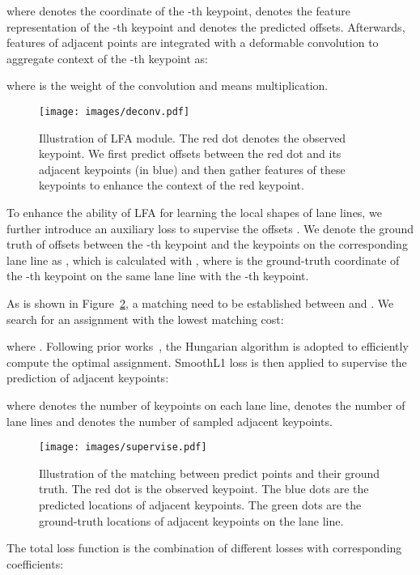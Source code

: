 \documentclass[10pt,twocolumn,letterpaper]{article}
\begin{document}
where  denotes the coordinate of the -th keypoint,  denotes the feature representation of the -th keypoint and  denotes the predicted offsets. 
Afterwards, features of adjacent points are integrated with a deformable convolution to aggregate context of the -th keypoint as:

where  is the weight of the convolution and  means multiplication. 

\begin{figure}[!t]
    \centering
    \texttt{[image: images/deconv.pdf]}
    \caption{Illustration of LFA module. The red dot denotes the observed keypoint. We first predict offsets between the red dot and its adjacent keypoints (in blue) and then gather features of these keypoints to enhance the context of the red keypoint.}
    \label{fig:dconv}
\end{figure}

To enhance the ability of LFA for learning the local shapes of lane lines, we further introduce an auxiliary loss to supervise the offsets .
We denote the ground truth of offsets between the -th keypoint and the keypoints on the corresponding lane line as , which is calculated with , where  is the ground-truth coordinate of the -th keypoint on the same lane line with the -th keypoint.

As is shown in Figure~\ref{fig:match}, a matching need to be established between  and . We search for an assignment  with the lowest matching cost:

where .
Following prior works~\cite{stewart2016end,carion2020end}, the Hungarian algorithm is adopted to efficiently compute the optimal assignment. SmoothL1 loss is then applied to supervise the prediction of adjacent keypoints:

where  denotes the number of keypoints on each lane line,  denotes the number of lane lines and  denotes the number of sampled adjacent keypoints.
\begin{figure}[!t]
    \centering
    \texttt{[image: images/supervise.pdf]}
    \caption{Illustration of the matching between predict points and their ground truth. The red dot is the observed keypoint. The blue dots are the predicted locations of adjacent keypoints. The green dots are the ground-truth locations of adjacent keypoints on the lane line.}
    \label{fig:match}
\end{figure}

The total loss function is the combination of different losses with corresponding coefficients:
\end{document}
